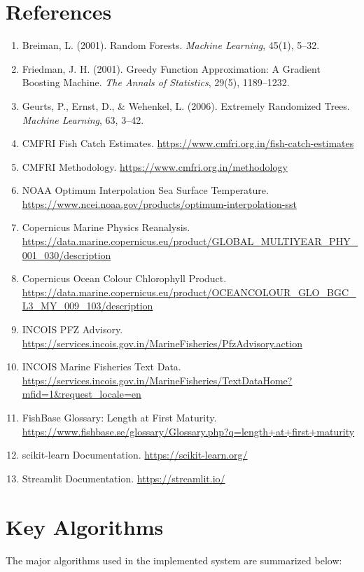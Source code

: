 \documentclass[12pt,a4paper]{report}
\begin{document}
\chapter*{References}
\begin{enumerate}[leftmargin=1.2cm]
    \item Breiman, L. (2001). Random Forests. \textit{Machine Learning}, 45(1), 5--32.
    \item Friedman, J. H. (2001). Greedy Function Approximation: A Gradient Boosting Machine. \textit{The Annals of Statistics}, 29(5), 1189--1232.
    \item Geurts, P., Ernst, D., \& Wehenkel, L. (2006). Extremely Randomized Trees. \textit{Machine Learning}, 63, 3--42.
    \item CMFRI Fish Catch Estimates. \url{https://www.cmfri.org.in/fish-catch-estimates}
    \item CMFRI Methodology. \url{https://www.cmfri.org.in/methodology}
    \item NOAA Optimum Interpolation Sea Surface Temperature. \url{https://www.ncei.noaa.gov/products/optimum-interpolation-sst}
    \item Copernicus Marine Physics Reanalysis. \url{https://data.marine.copernicus.eu/product/GLOBAL_MULTIYEAR_PHY_001_030/description}
    \item Copernicus Ocean Colour Chlorophyll Product. \url{https://data.marine.copernicus.eu/product/OCEANCOLOUR_GLO_BGC_L3_MY_009_103/description}
    \item INCOIS PFZ Advisory. \url{https://services.incois.gov.in/MarineFisheries/PfzAdvisory.action}
    \item INCOIS Marine Fisheries Text Data. \url{https://services.incois.gov.in/MarineFisheries/TextDataHome?mfid=1&request_locale=en}
    \item FishBase Glossary: Length at First Maturity. \url{https://www.fishbase.se/glossary/Glossary.php?q=length+at+first+maturity}
    \item scikit-learn Documentation. \url{https://scikit-learn.org/}
    \item Streamlit Documentation. \url{https://streamlit.io/}
\end{enumerate}

\appendix
\chapter{Key Algorithms}
The major algorithms used in the implemented system are summarized below:
\end{document}
